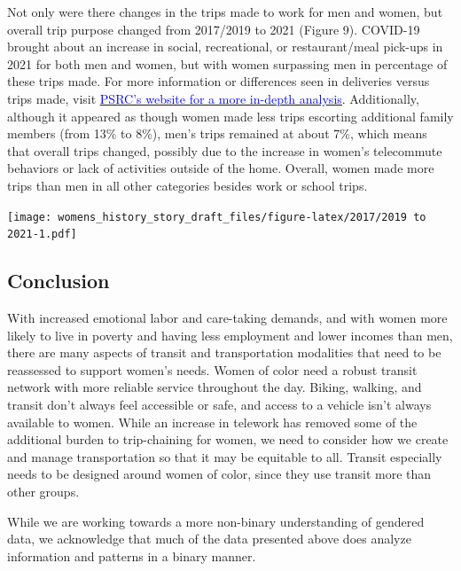 \documentclass[
  12pt,
]{article}
\begin{document}
\begin{flushleft}
Not only were there changes in the trips made to work for men and women, but overall trip purpose changed from 2017/2019 to 2021 (Figure 9). COVID-19 brought about an increase in social, recreational, or restaurant/meal pick-ups in 2021 for both men and women, but with women surpassing men in percentage of these trips made. For more information or differences seen in deliveries versus trips made, visit \href{https://www.psrc.org/media/7054}{\underline{\textcolor{blue}{PSRC's website for a more in-depth analysis}}}. Additionally, although it appeared as though women made less trips escorting additional family members (from 13\% to 8\%), men's trips remained at about 7\%, which means that overall trips changed, possibly due to the increase in women's telecommute behaviors or lack of activities outside of the home. Overall, women made more trips than men in all other categories besides work or school trips. 
\end{flushleft}

\texttt{[image: womens\_history\_story\_draft\_files/figure-latex/2017/2019 to 2021-1.pdf]}

\hypertarget{conclusion}{%
\subsection{Conclusion}\label{conclusion}}

\begin{flushleft}
With increased emotional labor and care-taking demands, and with women more likely to live in poverty and having less employment and lower incomes than men, there are many aspects of transit and transportation modalities that need to be reassessed to support women's needs. Women of color need a robust transit network with more reliable service throughout the day. Biking, walking, and transit don't always feel accessible or safe, and access to a vehicle isn't always available to women. While an increase in telework has removed some of the additional burden to trip-chaining for women, we need to consider how we create and manage transportation so that it may be equitable to all. Transit especially needs to be designed around women of color, since they use transit more than other groups.

While we are working towards a more non-binary understanding of gendered data, we acknowledge that much of the data presented above does analyze information and patterns in a binary manner.
\end{flushleft}
\end{document}
